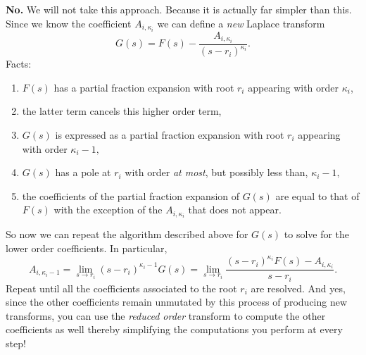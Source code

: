\textbf{No.}
We will not take this approach.
Because it is actually far simpler than this.
Since we know the coefficient \(A_{i, \kappa_i}\) we can define a \emph{new} Laplace transform
\[
  G(s)
    = 
      F(s) - \frac{A_{i, \kappa_i}}{(s - r_i)^{\kappa_i}}.
\]
Facts:
\begin{enumerate}
  \item{\(F(s)\) has a partial fraction expansion with root \(r_i\) appearing with order \(\kappa_i\),}
  \item{the latter term cancels this higher order term,}
  \item{\(G(s)\) is expressed as a partial fraction expansion with root \(r_i\) appearing with order \(\kappa_i - 1,\)}
  \item{\(G(s)\) has a pole at \(r_i\) with order \emph{at most}, but possibly less than, \(\kappa_i - 1,\)}
  \item{the coefficients of the partial fraction expansion of \(G(s)\) are equal to that of \(F(s)\) with the exception of the \(A_{i, \kappa_i}\) that does not appear.}
\end{enumerate}
So now we can repeat the algorithm described above for \(G(s)\) to solve for the lower order coefficients.
In particular,
\[
  A_{i, \kappa_i - 1}
    =
      \lim_{s \to r_i} (s - r_i)^{\kappa_i - 1} G(s)
    =
      \lim_{s \to r_i} \frac{(s - r_i)^{\kappa_i} F(s) - A_{i, \kappa_i}}{s - r_i}.
\]
Repeat until all the coefficients associated to the root \(r_i\) are resolved.
And yes, since the other coefficients remain unmutated by this process of producing new transforms, you can use the \emph{reduced order} transform to compute the other coefficients as well thereby simplifying the computations you perform at every step!

